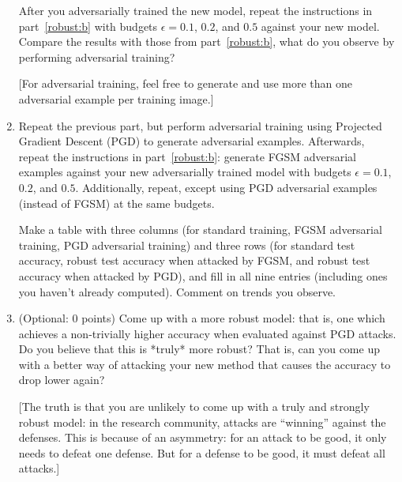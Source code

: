 \documentclass[10pt,letter,notitlepage]{article}
\newcounter{exercise}
\begin{document}
\begin{exercise}
\begin{enumerate}[label=\alph*)]
      After you adversarially trained the new model, repeat the instructions in part~\ref{robust:b} with budgets $\epsilon=0.1$, $0.2$, and $0.5$ against your new model.
      Compare the results with those from part~\ref{robust:b}, what do you observe by performing adversarial training?

		[For adversarial training, feel free to generate and use more than one adversarial example per training image.]
      \label{robust:c}

    \item Repeat the previous part, but perform adversarial training using Projected Gradient Descent (PGD) to generate adversarial examples.
      Afterwards, repeat the instructions in part~\ref{robust:b}: generate FGSM adversarial examples against your new adversarially trained model with budgets $\epsilon=0.1$, $0.2$, and $0.5$.
      Additionally, repeat, except using PGD adversarial examples (instead of FGSM) at the same budgets.

      Make a table with three columns (for standard training, FGSM adversarial training, PGD adversarial training) and three rows (for standard test accuracy, robust test accuracy when attacked by FGSM, and robust test accuracy when attacked by PGD), and fill in all nine entries (including ones you haven't already computed).
      Comment on trends you observe.



  \item (Optional: 0 points) Come up with a more robust model: that is, one which achieves a non-trivially higher accuracy when evaluated against PGD attacks. Do you believe that this is *truly* more robust? That is, can you come up with a better way of attacking your new method that causes the accuracy to drop lower again?

    [The truth is that you are unlikely to come up with a truly and strongly robust model: in the research community, attacks are ``winning'' against the defenses. This is because of an asymmetry: for an attack to be good, it only needs to defeat one defense. But for a defense to be good, it must defeat all attacks.]
	\end{enumerate}

\end{exercise}
\end{document}
